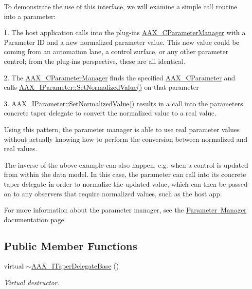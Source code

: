 To demonstrate the use of this interface, we will examine a simple call routine into a parameter\+:

\begin{DoxyParagraph}{}
1. The host application calls into the plug-\/in\textquotesingle{}s \mbox{\hyperlink{a01545}{A\+A\+X\+\_\+\+C\+Parameter\+Manager}} with a Parameter ID and a new normalized parameter value. This new value could be coming from an automation lane, a control surface, or any other parameter control; from the plug-\/in\textquotesingle{}s perspective, these are all identical.
\end{DoxyParagraph}
\begin{DoxyParagraph}{}
2. The \mbox{\hyperlink{a01545}{A\+A\+X\+\_\+\+C\+Parameter\+Manager}} finds the specified \mbox{\hyperlink{a01537}{A\+A\+X\+\_\+\+C\+Parameter}} and calls \mbox{\hyperlink{a01857_ad4b9a53e4e972d1a840ef094036e5a70}{A\+A\+X\+\_\+\+I\+Parameter\+::\+Set\+Normalized\+Value()}} on that parameter
\end{DoxyParagraph}
\begin{DoxyParagraph}{}
3. \mbox{\hyperlink{a01857_ad4b9a53e4e972d1a840ef094036e5a70}{A\+A\+X\+\_\+\+I\+Parameter\+::\+Set\+Normalized\+Value()}} results in a call into the parameter\textquotesingle{}s concrete taper delegate to convert the normalized value to a real value.
\end{DoxyParagraph}
Using this pattern, the parameter manager is able to use real parameter values without actually knowing how to perform the conversion between normalized and real values.

The inverse of the above example can also happen, e.\+g. when a control is updated from within the data model. In this case, the parameter can call into its concrete taper delegate in order to normalize the updated value, which can then be passed on to any observers that require normalized values, such as the host app.

For more information about the parameter manager, see the \mbox{\hyperlink{a00814}{Parameter Manager}} documentation page. \subsection*{Public Member Functions}
\begin{DoxyCompactItemize}
\item 
virtual \mbox{\hyperlink{a01877_a38bf3326334b9bc248c62faff2492d38}{$\sim$\+A\+A\+X\+\_\+\+I\+Taper\+Delegate\+Base}} ()
\begin{DoxyCompactList}\small\item\em Virtual destructor. \end{DoxyCompactList}\end{DoxyCompactItemize}


